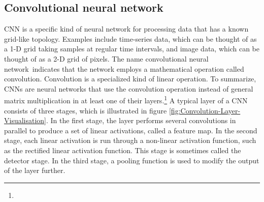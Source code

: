 \subsection{Convolutional neural network}
\label{sub:Convolutional-Neural-Network}
\Gls{CNN} is a specific kind of neural network for processing data that has a known grid-like topology. Examples include time-series data, which can be thought of as a 1-D grid taking samples at regular time intervals, and image data, which can be thought of as a 2-D grid of pixels. The name \flqq convolutional neural network\frqq \ indicates that the network employs a mathematical operation called convolution. Convolution is a specialized kind of linear operation. To summarize, \glspl{CNN} are neural networks that use the convolution operation instead of general matrix multiplication in at least one of their layers.\footnote{}
\newline
\newline
A typical layer of a \gls{CNN} consists of three stages, which is illustrated in figure \ref{fig:Convolution-Layer-Visualisation}. In the first stage, the layer performs several convolutions in parallel to produce a set of linear activations, called a feature map. In the second stage, each linear activation is run through a non-linear activation function, such as the rectified linear activation function. This stage is sometimes called the detector stage. In the third stage, a pooling function is used to modify the output of the layer further.


